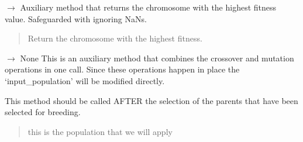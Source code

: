 \documentclass[letterpaper,10pt,english]{sphinxmanual}
\begin{document}
\begin{fulllineitems}

\begin{fulllineitems}
\label{\detokenize{pygenalgo.engines:pygenalgo.engines.generic_ga.GenericGA.best_chromosome}}
\pysigstartsignatures
\pysiglinewithargsret
{}
{}
{{ $\rightarrow$ {\hyperref[\detokenize{pygenalgo.genome:pygenalgo.genome.chromosome.Chromosome}]{}}}}
\pysigstopsignatures
\sphinxAtStartPar
Auxiliary method that returns the chromosome with the
highest fitness value. Safeguarded with ignoring NaNs.
\begin{quote}\begin{description}
\sphinxAtStartPar
Return the chromosome with the highest fitness.

\end{description}\end{quote}

\end{fulllineitems}


\begin{fulllineitems}
\label{\detokenize{pygenalgo.engines:pygenalgo.engines.generic_ga.GenericGA.crossover_mutate}}
\pysigstartsignatures
\pysiglinewithargsret
{}
{}
{{ $\rightarrow$ None}}
\pysigstopsignatures
\sphinxAtStartPar
This is an auxiliary method that combines the crossover and mutation
operations in one call. Since these operations happen in place the
‘input\_population’ will be modified directly.

\sphinxAtStartPar
This method should be called AFTER the selection of the parents that
have been selected for breeding.
\begin{quote}\begin{description}
\sphinxAtStartPar
{} \textendash{} this is the population that we will apply


\end{description}
\end{quote}
\end{fulllineitems}
\end{fulllineitems}
\end{document}
